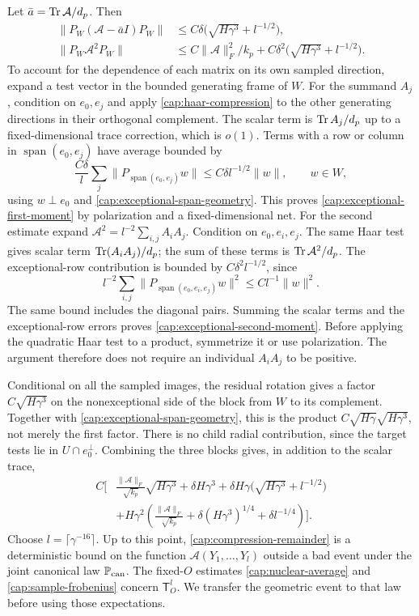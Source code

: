 Let \(\bar a=\operatorname{Tr}\mathcal A/d_p\). Then
\begin{align}
 \|P_W(\mathcal A-\bar a I)P_W\|
 &\le C\delta\bigl(\sqrt{H\gamma^3}+l^{-1/2}\bigr),
 \label{cap:exceptional-first-moment}\\
 \|P_W\mathcal A^2P_W\|
 &\le C\|\mathcal A\|_F^2/k_p
       +C\delta^2\bigl(\sqrt{H\gamma^3}+l^{-1/2}\bigr).
 \label{cap:exceptional-second-moment}
\end{align}
To account for the dependence of each matrix on its own sampled direction,
expand a test vector in the bounded generating frame of \(W\). For
the summand $A_j$, condition on $e_0,e_j$ and apply
\eqref{cap:haar-compression} to the other generating directions in their
orthogonal complement. The scalar term is $\operatorname{Tr} A_j/d_p$ up to a
fixed-dimensional trace correction, which is $o(1)$. Terms with a row or
column in $\operatorname{span}(e_0,e_j)$ have average bounded by
\[
 \frac{C\delta}{l}\sum_j\|P_{\operatorname{span}(e_0,e_j)}w\|
 \le C\delta l^{-1/2}\|w\|,
 \qquad w\in W,
\]
using $w\perp e_0$ and \eqref{cap:exceptional-span-geometry}. This proves
\eqref{cap:exceptional-first-moment} by polarization and a fixed-dimensional
net. For the second estimate expand $\mathcal A^2=l^{-2}\sum_{i,j}A_iA_j$.
Condition on $e_0,e_i,e_j$. The same Haar test gives scalar term
$\operatorname{Tr}(A_iA_j)/d_p$; the sum of these terms is $\operatorname{Tr}\mathcal A^2/d_p$. The
exceptional-row contribution is bounded by $C\delta^2l^{-1/2}$, since
\[
 l^{-2}\sum_{i,j}
  \|P_{\operatorname{span}(e_0,e_i,e_j)}w\|^2
 \le C l^{-1}\|w\|^2.
\]
The same bound includes the diagonal pairs. Summing the scalar terms and the
exceptional-row errors proves \eqref{cap:exceptional-second-moment}. Before
applying the quadratic Haar test to a product, symmetrize it or use
polarization. The argument therefore does not require an individual $A_iA_j$
to be positive.

Conditional on all the sampled images, the residual rotation gives a factor
$C\sqrt{H\gamma^3}$ on the nonexceptional side of the block from $W$ to its
complement. Together with \eqref{cap:exceptional-span-geometry}, this is the
product $C\sqrt{H\gamma}\sqrt{H\gamma^3}$, not merely the first factor. There
is no child radial contribution, since the target tests lie in $U\cap
e_0^\perp$. Combining the three blocks gives, in addition to the scalar trace,
\begin{align}
 C\biggl[&
 \frac{\|\mathcal A\|_F}{\sqrt{k_p}}\sqrt{H\gamma^3}
 +\delta H\gamma^3
 +\delta H\gamma\bigl(\sqrt{H\gamma^3}+l^{-1/2}\bigr)\nonumber\\
 &+H\gamma^2
 \left(\frac{\|\mathcal A\|_F}{\sqrt{k_p}}
       +\delta(H\gamma^3)^{1/4}+\delta l^{-1/4}\right)
 \biggr].\label{cap:compression-remainder}
\end{align}
Choose \(l=\lceil\gamma^{-16}\rceil\). Up to this point,
\eqref{cap:compression-remainder} is a deterministic bound on the function
\(\mathcal A(Y_1,\ldots,Y_l)\) outside a bad event under the joint canonical
law \(\mathbb P_{\rm can}\). The fixed-\(O\) estimates
\eqref{cap:nuclear-average} and \eqref{cap:sample-frobenius} concern
\(\mathsf T_O^l\). We transfer the geometric event to that law before using
those expectations.

